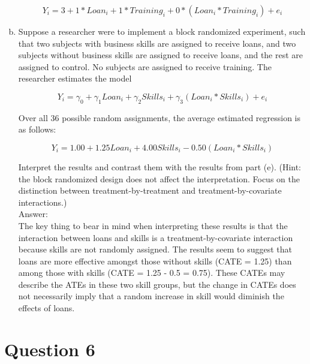 \documentclass[11pt,notitlepage]{article}\usepackage[]{graphicx}\usepackage[]{color}
\makeatletter
\newenvironment{kframe}{%
 \def\at@end@of@kframe{}%
 \ifinner\ifhmode%
  \def\at@end@of@kframe{\end{minipage}}%
  \begin{minipage}{\columnwidth}%
 \fi\fi%
 \def\FrameCommand##1{\hskip\@totalleftmargin \hskip-\fboxsep
 \colorbox{shadecolor}{##1}\hskip-\fboxsep
     \hskip-\linewidth \hskip-\@totalleftmargin \hskip\columnwidth}%
 \MakeFramed {\advance\hsize-\width
   \@totalleftmargin\z@ \linewidth\hsize
   \@setminipage}}%
 {\par\unskip\endMakeFramed%
 \at@end@of@kframe}
\newenvironment{knitrout}{}{} %
\makeatother
\begin{document}
\begin{enumerate}[a)]
\begin{equation}
Y_i = 3 + 1*Loan_i + 1*Training_i + 0*(Loan_i * Training_i) + e_i
\end{equation}


\item Suppose a researcher were to implement a block randomized experiment, such that two subjects with business skills are assigned to receive loans, and two subjects without business skills are assigned to receive loans, and the rest are assigned to control. No subjects are assigned to receive training. The researcher estimates the model

\begin{equation}
Y_i = \gamma_0 + \gamma_1 Loan_i + \gamma_2 Skills_i + \gamma_3 (Loan_i * Skills_i) + e_i
\end{equation}

Over all 36 possible random assignments, the average estimated regression is as follows:

\begin{equation}
Y_i = 1.00 + 1.25 Loan_i + 4.00 Skills_i - 0.50 (Loan_i * Skills_i)
\end{equation}

Interpret the results and contrast them with the results from part (e). (Hint: the block randomized design does not affect the interpretation. Focus on the distinction between treatment-by-treatment and treatment-by-covariate interactions.)\\
Answer:\\
The key thing to bear in mind when interpreting these results is that the interaction between loans and skills is a treatment-by-covariate interaction because skills are not randomly assigned. The results seem to suggest that loans are more effective amongst those without skills (CATE = 1.25) than among those with skills (CATE = 1.25 - 0.5 = 0.75). These CATEs may describe the ATEs in these two skill groups, but the change in CATEs does not necessarily imply that a random increase in skill would diminish the effects of loans.  
\end{enumerate}

\section*{Question 6}
\begin{knitrout}
\color{fgcolor}\begin{kframe}
\begin{verbatim}






\end{verbatim}
\end{kframe}
\end{knitrout}
\end{document}
